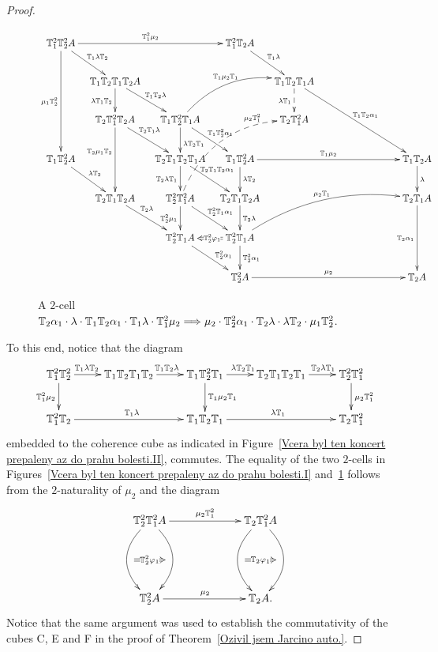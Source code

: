 \documentclass[12pt,leqno]{amsart}
\theoremstyle{definition}
\def\ttt#1#2{%
  \ifnum#1=0
    \ifnum#2=0
    \else
      \ifnum#2=1
        {\mathbb T}_1%
      \else
        {\mathbb T}_1^{#2}%
      \fi
    \fi
  \else
    \ifnum#2=0
      \ifnum#1=1
        {\mathbb T}_2%
      \else
        {\mathbb T}_2^{#1}%
      \fi
    \else
      \ifnum#1=1
        {\mathbb T}_2%
      \else
        {\mathbb T}_2^{#1}%
      \fi
      \ifnum#2=1
        {\mathbb T}_1%
      \else
        {\mathbb T}_1^{#2}%
      \fi
    \fi
  \fi
}
\def\iii#1#2{%
  \ifnum#1=0
    \ifnum#2=0
    \else
      \ifnum#2=1
        {\mathbb T}_2%
      \else
        {\mathbb T}_2^{#2}%
      \fi
    \fi
  \else
    \ifnum#2=0
      \ifnum#1=1
        {\mathbb T}_1%
      \else
        {\mathbb T}_1^{#1}%
      \fi
    \else
      \ifnum#1=1
        {\mathbb T}_1%
      \else
        {\mathbb T}_1^{#1}%
      \fi
      \ifnum#2=1
        {\mathbb T}_2%
      \else
        {\mathbb T}_2^{#2}%
      \fi
    \fi
  \fi
}
\newcommand{\4}{\texttt{4}}
\renewcommand{\phi}{\varphi}
\begin{document}
\begin{proof}
\begin{figure}
\[
\xymatrix@C=.9em{
{\iii22}A \ar[rrr]^{\iii20 \mu_2} \ar[rd]^{\iii10\lambda \iii01}  
\ar[ddd]_{\mu_1\iii02}
&&& {\iii21}A \ar[rd]^{\iii10\lambda}
\\
&{\iii10\iii01\iii10\iii01}A \ar[d]_{\lambda\iii10\iii01}
\ar[dr]^{\iii10\iii01\lambda} &&& {\iii10\iii01\iii10}A
\ar[ddrr]^{\iii11\alpha_1}  \ar@{-->}[d]_{\lambda \iii10}
\\
& {\iii01\iii20\iii01}A \ar[dr]^(.4){\iii01\iii10\lambda} 
\ar[dd]_(.4){\iii01\mu_1\iii01}  & {\iii10\iii02\iii10}A
\ar@/^2em/[rru]^{\iii10\mu_2\iii10} \ar[d]^(.6){\lambda\iii01\iii10} 
\ar[rd]^{\iii12\alpha_1}&&{\ttt12}A
\\
{\iii12}A  \ar[rd]^{\lambda \iii01}  && {\iii01\iii10\iii01\iii10}A
\ar[dr]^(.4){\iii01\iii11\alpha_1} \ar[d]_{\iii01\lambda\iii10}
 &{\iii12}A
\ar[rrr]^{\iii10\mu_2}  
\ar[d]^{\lambda \iii01}
&&&
{\iii11}A \ar[d]^\lambda
\\
&{\iii01\iii11}A \ar[rd]^(.4){\iii01\lambda} & {\iii02\iii20}A 
\ar[d]_{\iii02\mu_1}  \ar[dr]^{\ttt21\alpha_1}
\ar@/^2.5em/@{-->}[rruu]^(.75){\mu_2 \iii20}|(.28){\phantom{\rule{1em}{1em}}}
& {\iii01\iii11}A
\ar[d]^{\iii01\lambda} &&& {\ttt11}A \ar[dd]_{\iii01\alpha_1}
\\
&&{\iii02\iii10}A    \ar[rd]^(.6){\iii02\alpha_1}   
& {\iii02\iii10}A \ar@/^2em/[rrru]^{\mu_2 \iii10} \ar[d]^{\iii02\alpha_1} 
\ar@{=>}[l]|(.465){\iii02\phi_1}
\\
&&& {\iii02}A \ar[rrr]^{\mu_2} &&\hphantom{LLLLLLLLL}& {\iii01}A
}
\]
\caption{\label{Vcera byl ten koncert prepaleny az do prahu bolesti.II}
A $2$-cell $\iii01\alpha_1 \cdot \lambda \cdot
  \iii11\alpha_1 \cdot \iii10 \lambda \cdot \iii20\mu_2
\Longrightarrow \mu_2 \cdot \iii02\alpha_1 \cdot \iii01 \lambda \cdot
\lambda \iii01 \cdot \mu_1 \iii02$.} 
\end{figure}
To this end, notice that the diagram 
\[
\xymatrix{
{\iii22} \ar[r]^(.4){\iii10\lambda\iii01}\ar[d]_{\iii20\mu_2}   &
\ar[r]^{\iii11 \lambda} {\iii11\iii11} &
\ar[r]^{\lambda\ttt11} {\iii12\ttt01} \ar[d]^{\iii10 \mu_2 \iii10} & 
\ar[r]^(.6){\iii01\lambda\iii10} {\ttt11\ttt11}& {\iii02\iii20}
\ar[d]^{\mu_2\iii20}
\\
{\iii21} \ar[rr]^{\iii10\lambda} &&
 \ar[rr]^{\lambda\iii10} {\iii11\iii10} && {\ttt12}
}
\]
embedded to the coherence cube as indicated in Figure~\ref{Vcera byl
  ten koncert prepaleny az do prahu bolesti.II}, 
commutes. The equality of the two $2$-cells in 
Figures~\ref{Vcera byl ten koncert prepaleny az do prahu bolesti.I}
and~\ref{Vcera byl ten koncert prepaleny az do prahu bolesti.II}
follows from the $2$-naturality of
$\mu_2$ and the diagram
\[
\xymatrix@C=-.4em{
&{\ttt22} A\ar[rrrrrrrrrrr]^{\mu_2\ttt02}
 \ar@/^2.1em/[dd] \ar@/_2,1em/[dd] &&&&&&&\hphantom{BBBBBB}&&&&  
\ar@/_2.1em/[dd]  \ar@/^2.1em/[dd]   {\ttt12}  A
\\
\ar@{=>}[rr]|{\ttt20\phi_1} &&&&&&&&&&&\ar@{=>}[rr]|{\ttt10\phi_1}&&
\\
&{\ttt20} A \ar[rrrrrrrrrrr]^{\mu_2} &&&&&&&&&&& {\ttt10} A.
}
\]
Notice that the same argument was used to establish the
commutativity of the cubes C, E and F in the proof of
Theorem~\ref{Ozivil jsem Jarcino auto.}. 
 

\end{proof}
\end{document}
